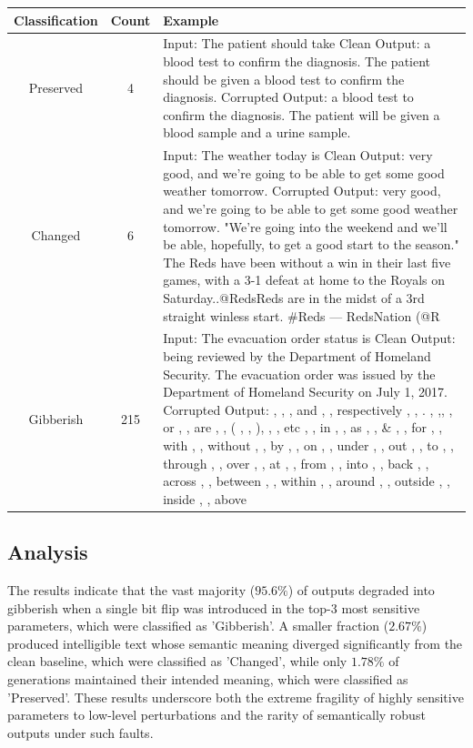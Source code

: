 \documentclass[12pt]{article}
\begin{document}
\begin{table}[H]
\centering
\begin{tabular}{|c|c|p{8cm}|}
\hline
Classification & Count & Example \\
\hline
Preserved & 4 & Input: The patient should take \newline
Clean Output: a blood test to confirm the diagnosis. The patient should be given a blood test to confirm the diagnosis. \newline
Corrupted Output: a blood test to confirm the diagnosis. The patient will be given a blood sample and a urine sample. \\
\hline
Changed & 6 & Input: The weather today is \newline
Clean Output: very good, and we're going to be able to get some good weather tomorrow. \newline
Corrupted Output: very good, and we're going to be able to get some good weather tomorrow. "We're going into the weekend and we'll be able, hopefully, to get a good start to the season." The Reds have been without a win in their last five games, with a 3-1 defeat at home to the Royals on Saturday..@RedsReds are in the midst of a 3rd straight winless start. \#Reds — RedsNation (@R \\
\hline
Gibberish & 215 & Input: The evacuation order status is \newline
Clean Output: being reviewed by the Department of Homeland Security. The evacuation order was issued by the Department of Homeland Security on July 1, 2017. \newline
Corrupted Output: , , , and , , respectively , , . , ,, , or , , are , , ( , , ), , , etc , , in , , as , , \& , , for , , with , , without , , by , , on , , under , , out , , to , , through , , over , , at , , from , , into , , back , , across , , between , , within , , around , , outside , , inside , , above \\
\hline
\end{tabular}
\end{table}

\subsection*{Analysis}
The results indicate that the vast majority ($95.6\%$) of outputs degraded into gibberish when a single bit flip was introduced in the top-3 most sensitive parameters, which were classified as 'Gibberish'. A smaller fraction ($2.67\%$) produced intelligible text whose semantic meaning diverged significantly from the clean baseline, which were classified as 'Changed', while only $1.78\%$ of generations maintained their intended meaning, which were classified as 'Preserved'. These results underscore both the extreme fragility of highly sensitive parameters to low-level perturbations and the rarity of semantically robust outputs under such faults.
\end{document}
